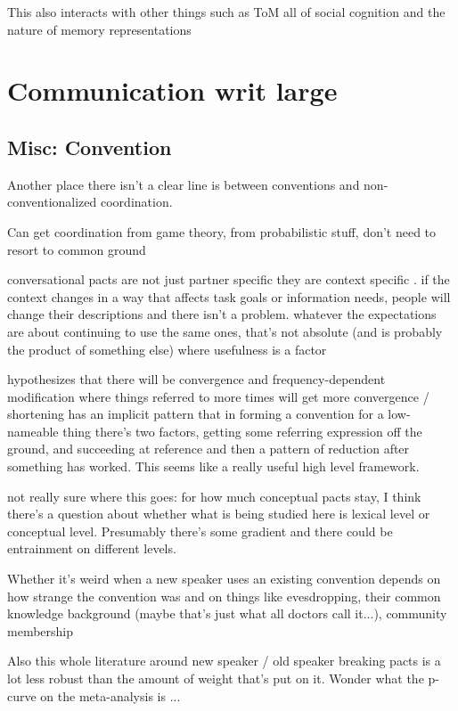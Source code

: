 \documentclass[]{article}
\begin{document}
This also interacts with other things such as ToM all of social cognition and the nature of memory representations 


\section{Communication writ large}
\subsection{Misc: Convention}

Another place there isn't a clear line is between conventions and non-conventionalized coordination. 

Can get coordination from game theory, from probabilistic stuff, don't need to resort to common ground

conversational pacts are not just partner specific they are context specific \cite{ibarra2016}. if the context changes in a way that affects task goals or information needs, people will change their descriptions and there isn't a problem. whatever the expectations are about continuing to use the same ones, that's not absolute (and is probably the product of something else) where usefulness is a factor 

\cite{krauss1964} hypothesizes that there will be convergence and frequency-dependent modification where things referred to more times will get more convergence / shortening
 \cite{leung2023} has an implicit pattern that in forming a convention for a low-nameable thing there's two factors, getting some referring expression off the ground, and succeeding at reference and then a pattern of reduction after something has worked. This seems like a really useful high level framework. 
 
 not really sure where this goes: \cite{metzing2003a} for how much conceptual pacts stay, I think there's a question about whether what is being studied here is lexical level or conceptual level. Presumably there's some gradient and there could be entrainment on different levels. 
 
 Whether it's weird when a new speaker uses an existing convention depends on how strange the convention was and on things like evesdropping, their common knowledge background (maybe that's just what all doctors call it...), community membership
 
 Also this whole literature around new speaker / old speaker breaking pacts is a lot less robust than the amount of weight that's put on it. Wonder what the p-curve on the meta-analysis is ... 
 
\end{document}
